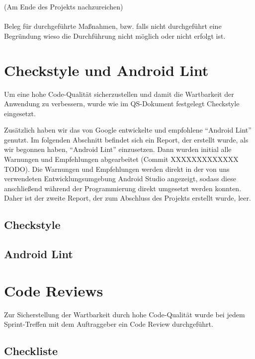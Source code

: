
    (Am Ende des Projekts nachzureichen)\\\\
    Beleg für durchgeführte Maßnahmen, bzw. falls nicht durchgeführt eine Begründung wieso die Durchführung nicht möglich oder nicht erfolgt ist. \\


\section{Checkstyle und Android Lint}

Um eine hohe Code-Qualität sicherzustellen und damit die Wartbarkeit der
Anwendung zu verbessern, wurde wie im QS-Dokument festgelegt Checkstyle eingesetzt.

Zusätzlich haben wir das von Google entwickelte und empfohlene ``Android Lint''
genutzt.
Im folgenden Abschnitt befindet sich ein Report, der erstellt wurde,
als wir begonnen haben, ``Android Lint'' einzusetzen. Dann wurden initial alle
Warnungen und Empfehlungen abgearbeitet (Commit XXXXXXXXXXXXX TODO).
Die Warnungen und Empfehlungen werden direkt in der von uns verwendeten
Entwicklungsumgebung Android Studio angezeigt, sodass diese anschließend während
der Programmierung direkt umgesetzt werden konnten. Daher ist der zweite Report,
der zum Abschluss des Projekts erstellt wurde, leer.


\subsection{Checkstyle}
\subsection{Android Lint}


\clearpage


\section{Code Reviews}

Zur Sicherstellung der Wartbarkeit durch hohe Code-Qualität wurde bei jedem
Sprint-Treffen mit dem Auftraggeber ein Code Review durchgeführt.


\subsection{Checkliste}

